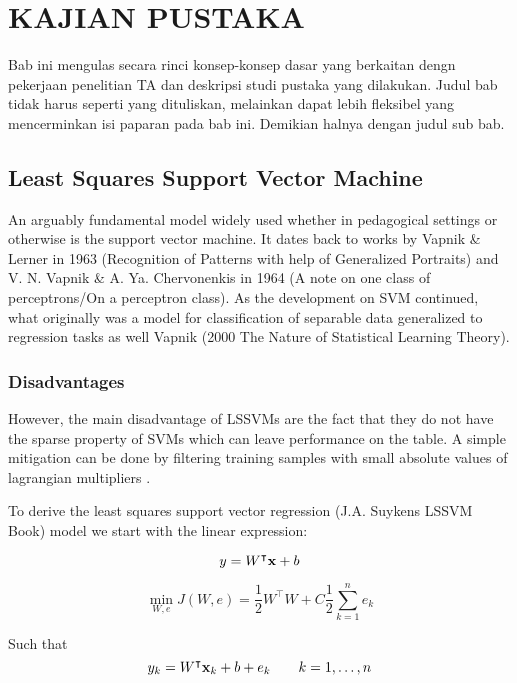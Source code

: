 \chapter{KAJIAN PUSTAKA}

\noindent Bab ini mengulas secara rinci konsep-konsep dasar yang berkaitan dengn pekerjaan penelitian TA dan deskripsi studi pustaka yang dilakukan. Judul bab tidak harus seperti yang dituliskan, melainkan dapat lebih fleksibel yang mencerminkan isi paparan pada bab ini. Demikian halnya dengan judul sub bab.

\section{Least Squares Support Vector Machine}
\noindent An arguably fundamental model widely used whether in pedagogical settings or otherwise is the support vector machine. It dates back to works by Vapnik \& Lerner in 1963 (Recognition of Patterns with help of Generalized Portraits) and V. N. Vapnik \& A. Ya. Chervonenkis in 1964 (A note on one class of perceptrons/On a perceptron class). As the development on SVM continued, what originally was a model for classification of separable data generalized to regression tasks as well Vapnik (2000 The Nature of Statistical Learning Theory). 
\subsection{Disadvantages}
However, the main disadvantage of LSSVMs are the fact that they do not have the sparse property of SVMs which can leave performance on the table. A simple mitigation can be done by filtering training samples with small absolute values of lagrangian multipliers \autocite{haifengwangComparisonSVMLSSVM2005}.

To derive the least squares support vector regression (J.A. Suykens LSSVM Book) model we start with the linear expression:

\begin{equation}
        y=W^{\intercal}\vb{x}+b
\end{equation}

\begin{equation}
        \min_{W,e} J(W,e) = \frac{1}{2}W^{\intercal}W + C\frac{1}{2}\sum_{k=1}^{n}e_{k}
\end{equation}

Such that
\begin{equation}
        y_{k}=W^{\intercal}\vb{x}_{k}+b+e_{k} \qquad k=1,\dots,n
\end{equation}

